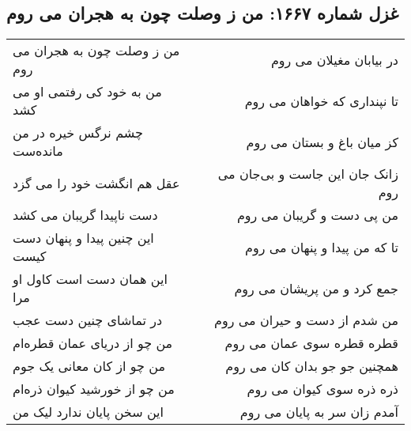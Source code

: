 \begin{center}
\section*{غزل شماره ۱۶۶۷: من ز وصلت چون به هجران می روم}
\label{sec:1667}
\begin{longtable}{l p{0.5cm} r}
من ز وصلت چون به هجران می روم
&&
در بیابان مغیلان می روم
\\
من به خود کی رفتمی او می کشد
&&
تا نپنداری که خواهان می روم
\\
چشم نرگس خیره در من مانده‌ست
&&
کز میان باغ و بستان می روم
\\
عقل هم انگشت خود را می گزد
&&
زانک جان این جاست و بی‌جان می روم
\\
دست ناپیدا گریبان می کشد
&&
من پی دست و گریبان می روم
\\
این چنین پیدا و پنهان دست کیست
&&
تا که من پیدا و پنهان می روم
\\
این همان دست است کاول او مرا
&&
جمع کرد و من پریشان می روم
\\
در تماشای چنین دست عجب
&&
من شدم از دست و حیران می روم
\\
من چو از دریای عمان قطره‌ام
&&
قطره قطره سوی عمان می روم
\\
من چو از کان معانی یک جوم
&&
همچنین جو جو بدان کان می روم
\\
من چو از خورشید کیوان ذره‌ام
&&
ذره ذره سوی کیوان می روم
\\
این سخن پایان ندارد لیک من
&&
آمدم زان سر به پایان می روم
\\
\end{longtable}
\end{center}
